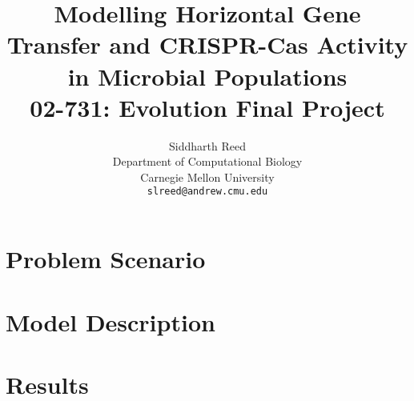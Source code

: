 
\title{Modelling Horizontal Gene Transfer and CRISPR-Cas Activity in Microbial Populations\\
    \large 02-731: Evolution Final Project}

\author{
  Siddharth Reed \\
  Department of Computational Biology\\
  Carnegie Mellon University\\
  \texttt{slreed@andrew.cmu.edu}
}


\maketitle
\newpage

\section{Problem Scenario}


\section{Model Description}


\section{Results}



